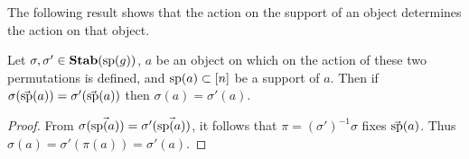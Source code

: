 \documentclass[../paper.tex]{subfiles}
\begin{document}

The following result shows that the action on the support of an object
determines the action on that object.

\begin{lem}
  \label{lem:support_determine_action}
  Let $\sigma, \sigma' \in \text{\textbf{Stab}} (\text{sp} (g))$, $a$ be an object on which on the action
  of these two permutations is defined, and $\text{sp}(a) \subset [n]$ be a support
  of $a$. Then if $\sigma (\vec{\text{sp}}(a)) = \sigma' (\vec{\text{sp}}(a))$ then
  $\sigma (a) = \sigma' (a)$.
\end{lem}
\begin{proof}
  From $\sigma (\vec{\text{sp}(a)}) = \sigma' (\vec{\text{sp}(a)})$, it follows that
  $\pi = (\sigma')^{-1} \sigma$ fixes $\vec{\text{sp}}(a)$. Thus $\sigma (a) =
  \sigma' (\pi (a)) = \sigma' (a)$.
\end{proof}




\end{document}
